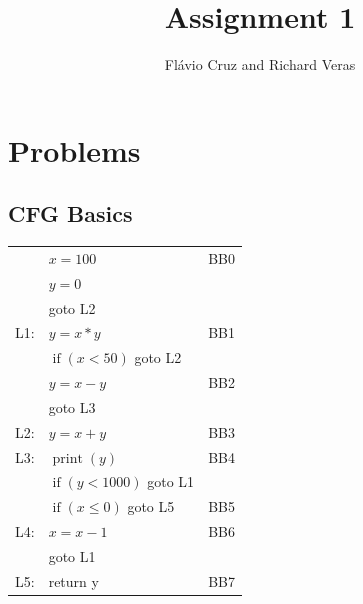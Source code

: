 \documentclass[12pt]{article}
\author{Fl\'{a}vio Cruz and Richard Veras}
\title{Assignment 1}
\begin{document}
\maketitle




\section{Problems}

\subsection{CFG Basics}

\begin{minipage}[b]{0.5\linewidth}
\centering


\begin{tabular}{| l l| l}
  \cline{0-1}
  & $x = 100$ & BB0 \\
  & $y = 0$ &  \\
  & goto L2 &  \\
  \cline{0-1}
  L1: & $y = x * y$ & BB1 \\
  & $ \operatorname{if}(x < 50 )$ goto L2 &  \\
  \cline{0-1}
  & $y = x - y$ &  BB2\\
  & goto L3 & \\
  \cline{0-1}
  L2: & $y = x + y$ & BB3 \\
  \cline{0-1}
  L3: & $\operatorname{print}(y)$ & BB4 \\
  & $ \operatorname{if}(y < 1000 )$ goto L1 &  \\
  \cline{0-1}
  & $ \operatorname{if}(x \le 0 )$ goto L5 & BB5  \\
  \cline{0-1}
  L4: & $x = x-1$ & BB6 \\
  & goto L1 & \\
  \cline{0-1}
  L5: & return y & BB7 \\
  \cline{0-1}

\end{tabular}

\label{fig:figure1}
\end{minipage}
\hspace{0.5cm}
\end{document}
